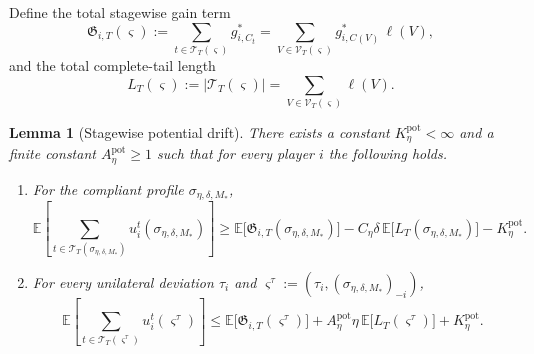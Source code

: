 \documentclass[12pt]{article}
\newtheorem{lemma}[theorem]{Lemma}
\theoremstyle{definition}
\newcommand{\E}{\mathbb{E}}
\newcommand{\1}{\mathbf{1}}
\begin{document}
Define the total stagewise gain term
\begin{equation}
\label{eq:gain-chain-def}
\mathfrak G_{i,T}(\varsigma)
:=
\sum_{t\in\mathcal T_T(\varsigma)} g_{i,C_t}^*
=
\sum_{V\in\mathcal V_T(\varsigma)} g_{i,C(V)}^*\,\ell(V),
\end{equation}
and the total complete-tail length
\[
L_T(\varsigma):=|\mathcal T_T(\varsigma)|
=
\sum_{V\in\mathcal V_T(\varsigma)}\ell(V).
\]

\begin{lemma}[Stagewise potential drift]
\label{lem:visit-bellman}
There exists a constant $K_\eta^{\mathrm{pot}}<\infty$ and a finite constant
$A_\eta^{\mathrm{pot}}\ge 1$ such that for every player $i$ the following holds.

\begin{enumerate}[label=\textnormal{(\alph*)},leftmargin=2.8em]
\item For the compliant profile $\sigma_{\eta,\delta,M_*}$,
\begin{equation}
\label{eq:stagewise-potential-compliant}
\E\left[
\sum_{t\in\mathcal T_T(\sigma_{\eta,\delta,M_*})}
u_i^t(\sigma_{\eta,\delta,M_*})
\right]
\ge
\E\bigl[\mathfrak G_{i,T}(\sigma_{\eta,\delta,M_*})\bigr]
-
C_\eta\delta\,\E\bigl[L_T(\sigma_{\eta,\delta,M_*})\bigr]
-
K_\eta^{\mathrm{pot}}.
\end{equation}

\item For every unilateral deviation $\tau_i$ and
$\varsigma^\tau:=(\tau_i,(\sigma_{\eta,\delta,M_*})_{-i})$,
\begin{equation}
\label{eq:stagewise-potential-deviator}
\E\left[
\sum_{t\in\mathcal T_T(\varsigma^\tau)}
u_i^t(\varsigma^\tau)
\right]
\le
\E\bigl[\mathfrak G_{i,T}(\varsigma^\tau)\bigr]
+
A_\eta^{\mathrm{pot}}\eta\,
\E\bigl[L_T(\varsigma^\tau)\bigr]
+
K_\eta^{\mathrm{pot}}.
\end{equation}
\end{enumerate}
\end{lemma}
\end{document}
